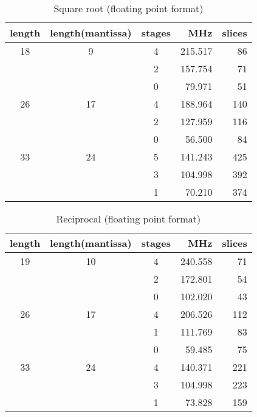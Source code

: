 \documentclass[times, 10pt,twocolumn]{article}
\begin{document}
\begin{table}
\caption{Square root (floating point format)}
\begin{center}
\begin{tabular}{cccrr}
\hline
\hline
length  & length(mantissa) & stages & MHz & slices\\
\hline
18   &  9 & 4 & 215.517 & 86 \\
     &    & 2 & 157.754 & 71 \\
     &    & 0 &  79.971 & 51 \\
\hline
26   & 17 & 4 & 188.964 & 140 \\
     &    & 2 & 127.959 & 116 \\
     &    & 0 &  56.500 &  84 \\
\hline
33   & 24 & 5 & 141.243 & 425 \\
     &    & 3 & 104.998 & 392 \\
     &    & 1 &  70.210 & 374 \\
\hline
\hline
\end{tabular}
\end{center}
\label{tabpg_float_sqrt}
\end{table}

\begin{table}
\caption{Reciprocal (floating point format)}
\begin{center}
\begin{tabular}{cccrr}
\hline
\hline
length  & length(mantissa) & stages & MHz & slices\\
\hline
19   & 10 & 4 & 240.558 & 71 \\
     &    & 2 & 172.801 & 54 \\
     &    & 0 & 102.020 & 43 \\
\hline
26   & 17 & 4 & 206.526 & 112 \\
     &    & 1 & 111.769 &  83 \\
     &    & 0 &  59.485 &  75 \\
\hline
33   & 24 & 4 & 140.371 & 221 \\
     &    & 3 & 104.998 & 223 \\
     &    & 1 &  73.828 & 159 \\
\hline
\hline
\end{tabular}
\end{center}
\label{tabpg_float_recipro}
\end{table}
\end{document}

